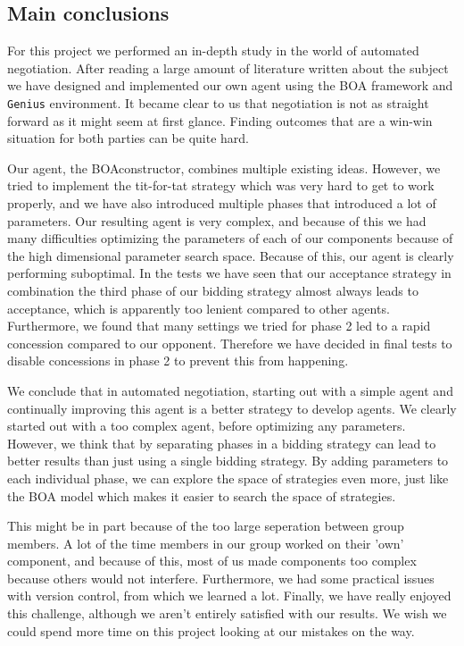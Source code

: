 
\subsection{Main conclusions}

For this project we performed an in-depth study in the world of automated negotiation. After reading a large amount of literature written about the subject we have designed and implemented our own agent using the BOA framework and \texttt{Genius} environment. It became clear to us that negotiation is not as straight forward as it might seem at first glance. Finding outcomes that are a win-win situation for both parties can be quite hard.

Our agent, the BOAconstructor, combines multiple existing ideas.
However, we tried to implement the tit-for-tat strategy which was very hard to get to work properly, and we have also introduced multiple phases that introduced a lot of parameters.
Our resulting agent is very complex, and because of this we had many difficulties optimizing the parameters of each of our components because of the high dimensional parameter search space. Because of this, our agent is clearly performing suboptimal.
In the tests we have seen that our acceptance strategy in combination the third phase of our bidding strategy
almost always leads to acceptance, which is apparently too lenient compared to other agents.
Furthermore, we found that many settings we tried for phase 2 led to a rapid concession compared to our opponent. 
Therefore we have decided in final tests to disable concessions in phase 2 to prevent this from happening.

We conclude that in automated negotiation, starting out with a simple agent and 
continually improving this agent is a better strategy to develop agents. 
We clearly started out with a too complex agent, before optimizing any parameters.
However, we think that by separating phases in a bidding strategy can lead to 
better results than just using a single bidding strategy. By adding parameters
to each individual phase, we can explore the space of strategies even more,
just like the BOA model which makes it easier to search the space of strategies.

This might be in part because of the too large seperation between group members.
A lot of the time members in our group worked on their 'own' component, 
and because of this, most of us made components too complex because others would not interfere.
Furthermore, we had some practical issues with version control, from which we learned a lot.
Finally, we have really enjoyed this challenge, although we aren't entirely satisfied with 
our results. We wish we could spend more time on this project looking at our mistakes
on the way.
 
